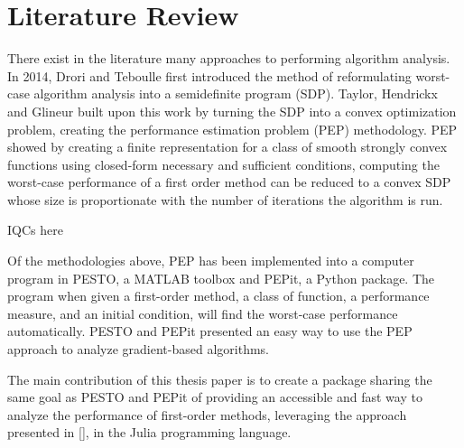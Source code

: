  \chapter{Literature Review}

There exist in the literature many approaches to performing algorithm analysis. In 2014, Drori and Teboulle first introduced the method of reformulating worst-case algorithm analysis into a semidefinite program (SDP). Taylor, Hendrickx and Glineur built upon this work by turning the SDP into a convex optimization problem, creating the performance estimation problem (PEP) methodology. PEP showed by creating a finite representation for a class of smooth strongly convex functions using closed-form necessary and sufficient conditions, computing the worst-case performance of a first order method can be reduced to a convex SDP whose size is proportionate with the number of iterations the algorithm is run.

IQCs here

Of the methodologies above, PEP has been implemented into a computer program in PESTO, a MATLAB toolbox and PEPit, a Python package. The program when given a first-order method, a class of function, a performance measure, and an initial condition, will find the worst-case performance automatically. PESTO and PEPit presented an easy way to use the PEP approach to analyze gradient-based algorithms.

The main contribution of this thesis paper is to create a package sharing the same goal as PESTO and PEPit of providing an accessible and fast way to analyze the performance of first-order methods, leveraging the approach presented in [], in the Julia programming language.